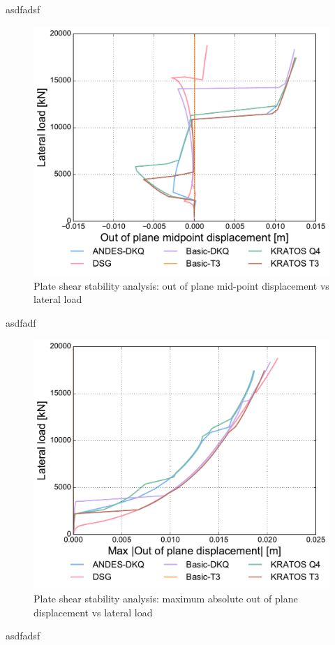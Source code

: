 asdfadsf

\begin{figure}[H]
	\centering
	\def\svgwidth{\columnwidth}
	\includegraphics[width=12cm]{images/stability_wrinkle_pointtrans_disp.pdf}
	\caption{Plate shear stability analysis: out of plane mid-point displacement vs lateral load}
	\label{pic:wrinkle2}
\end{figure}

asdfadf

\begin{figure}[H]
	\centering
	\def\svgwidth{\columnwidth}
	\includegraphics[width=12cm]{images/stability_wrinkle_abstrans_disp.pdf}
	\caption{Plate shear stability analysis: maximum absolute out of plane displacement vs lateral load}
	\label{pic:wrinkle3}
\end{figure}

asdfadsf
